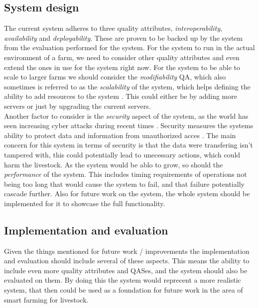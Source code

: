 \subsection{System design}
The current system adheres to three quality attributes, \textit{interoperability}, \textit{availability} and \textit{deployability}. These are proven to be backed up by the system from the evaluation performed for the system.
For the system to run in the actual environment of a farm, we need to consider other quality attributes and even extend the ones in use for the system right now. For the system to be able to scale to larger farms we should consider the \textit{modifiability} QA, which also sometimes is referred to as the \textit{scalability} of the system, which helps defining the ability to add resources to the system \cite{Bass2012Software}. This could either be by adding more servers or just by upgrading the current servers. \vspace{2mm} \\
Another factor to consider is the \textit{security} aspect of the system, as the world has seen increasing cyber attacks during recent times \cite{Ford_2023}. Security measures the systems ability to protect data and information from unauthorized acces \cite{Bass2012Software}. The main concern for this system in terms of security is that the data were transfering isn't tampered with, this could potentially lead to unecessary actions, which could harm the livestock.
As the system would be ablo to grow, so should the \textit{performance} of the system. This includes timing requirements \cite{Bass2012Software} of operations not being too long that would cause the system to fail, and that failure potentially cascade further. Also for future work on the system, the whole system should be implemented for it to showcase the full functionality.

\subsection{Implementation and evaluation}
Given the things mentioned for future work / improvements the implementation and evaluation should include several of these aspects. This means the ability to include even more quality attributes and QASes, and the system should also be evaluated on them. By doing this the system would reprecent a more realistic system, that then could be used as a foundation for future work in the area of smart farming for livestock.
